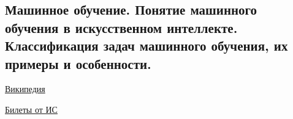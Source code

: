 \subsection{Машинное обучение. Понятие машинного обучения в искусственном интеллекте. Классификация задач машинного обучения, их примеры и особенности.}

\href{https://ru.wikipedia.org/wiki/%D0%9C%D0%B0%D1%88%D0%B8%D0%BD%D0%BD%D0%BE%D0%B5_%D0%BE%D0%B1%D1%83%D1%87%D0%B5%D0%BD%D0%B8%D0%B5#:~:text=%D0%9C%D0%B0%D1%88%D0%B8%D0%BD%D0%BD%D0%BE%D0%B5%20%D0%BE%D0%B1%D1%83%D1%87%D0%B5%D0%BD%D0%B8%D0%B5%20(%D0%B0%D0%BD%D0%B3%D0%BB.,%D0%BF%D1%80%D0%B8%D0%BC%D0%B5%D0%BD%D0%B5%D0%BD%D0%B8%D1%8F%20%D1%80%D0%B5%D1%88%D0%B5%D0%BD%D0%B8%D0%B9%20%D0%BC%D0%BD%D0%BE%D0%B6%D0%B5%D1%81%D1%82%D0%B2%D0%B0%20%D1%81%D1%85%D0%BE%D0%B4%D0%BD%D1%8B%D1%85%20%D0%B7%D0%B0%D0%B4%D0%B0%D1%87.}{Википедия}

\href{https://docs.google.com/document/d/1Q9Q3T_WhroC04ByS0BtFDbvEZ6DrQbuFPd7fAl2XSWM/edit#}{Билеты от ИС}
